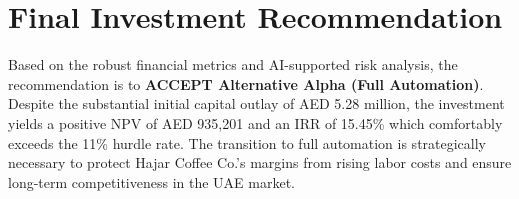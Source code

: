 \documentclass[12pt]{article}
\begin{document}
\section{Final Investment Recommendation}
Based on the robust financial metrics and AI-supported risk analysis, the recommendation is to \textbf{ACCEPT Alternative Alpha (Full Automation)}. 
Despite the substantial initial capital outlay of AED 5.28 million, the investment yields a positive NPV of AED 935,201 and an IRR of 15.45\% which comfortably exceeds the 11\% hurdle rate. The transition to full automation is strategically necessary to protect Hajar Coffee Co.'s margins from rising labor costs and ensure long-term competitiveness in the UAE market. 
\end{document}
